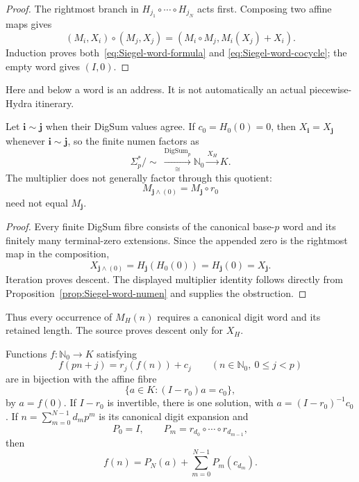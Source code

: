 \begin{proof}
The rightmost branch in $H_{j_1}\circ\cdots\circ H_{j_N}$ acts first.
Composing two affine maps gives
\[
 (M_i,X_i)\circ(M_j,X_j)
 =(M_i\circ M_j,M_i(X_j)+X_i).
\]
Induction proves both~\eqref{eq:Siegel-word-formula} and
\eqref{eq:Siegel-word-cocycle}; the empty word gives $(I,0)$.
\end{proof}

Here and below a word is an address.  It is not automatically an actual
piecewise-Hydra itinerary.

\begin{proposition}
\label{prop:Siegel-centered-numen-descent}
Let $\mathbf i\sim\mathbf j$ when their DigSum values agree.  If
$c_0=H_0(0)=0$, then $X_{\mathbf i}=X_{\mathbf j}$ whenever
$\mathbf i\sim\mathbf j$, so the finite numen factors as
\[
 \Sigma_p^*/{\sim}\ \xrightarrow[\cong]{\operatorname{DigSum}_p}\mathbb N_0
 \xrightarrow{X_H}K.
\]
The multiplier does not generally factor through this quotient:
\[
 M_{\mathbf j\wedge(0)}=M_{\mathbf j}\circ r_0
\]
need not equal $M_{\mathbf j}$.
\end{proposition}

\begin{proof}
Every finite DigSum fibre consists of the canonical base-$p$ word and its
finitely many terminal-zero extensions.  Since the appended zero is the
rightmost map in the composition,
\[
 X_{\mathbf j\wedge(0)}
 =H_{\mathbf j}(H_0(0))=H_{\mathbf j}(0)=X_{\mathbf j}.
\]
Iteration proves descent.  The displayed multiplier identity follows directly
from Proposition~\ref{prop:Siegel-word-numen} and supplies the obstruction.
\end{proof}

Thus every occurrence of $M_H(n)$ requires a canonical digit word and its
retained length.  The source proves descent only for $X_H$.

\begin{proposition}
\label{prop:Siegel-numen-functional-equations}
Functions $f:\mathbb N_0\to K$ satisfying
\begin{equation}
\label{eq:Siegel-finite-recursion}
 f(pn+j)=r_j(f(n))+c_j
 \qquad(n\in\mathbb N_0,\ 0\leq j<p)
\end{equation}
are in bijection with the affine fibre
\[
 \{a\in K:(I-r_0)a=c_0\},
\]
by $a=f(0)$.  If $I-r_0$ is invertible, there is one solution, with
$a=(I-r_0)^{-1}c_0$.  If
$n=\sum_{m=0}^{N-1}d_m p^m$ is its canonical digit expansion and
\[
 P_0=I,\qquad P_m=r_{d_0}\circ\cdots\circ r_{d_{m-1}},
\]
then
\begin{equation}
\label{eq:Siegel-corrected-finite-truncation}
 f(n)=P_N(a)+\sum_{m=0}^{N-1}P_m(c_{d_m}).
\end{equation}
\end{proposition}

